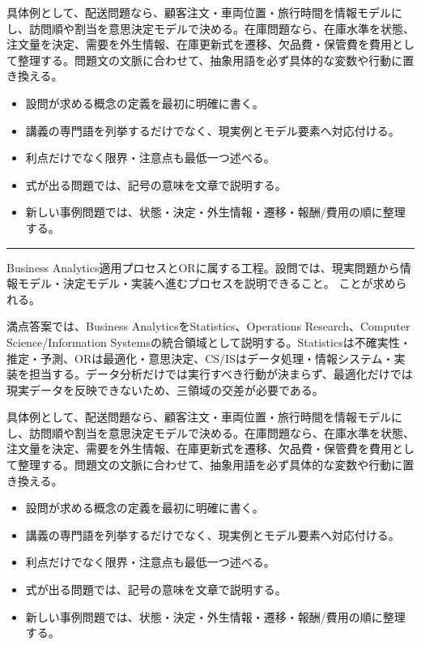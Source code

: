 具体例として、配送問題なら、顧客注文・車両位置・旅行時間を情報モデルにし、訪問順や割当を意思決定モデルで決める。在庫問題なら、在庫水準を状態、注文量を決定、需要を外生情報、在庫更新式を遷移、欠品費・保管費を費用として整理する。問題文の文脈に合わせて、抽象用語を必ず具体的な変数や行動に置き換える。\par
{}
\begin{itemize}
\item 設問が求める概念の定義を最初に明確に書く。
\item 講義の専門語を列挙するだけでなく、現実例とモデル要素へ対応付ける。
\item 利点だけでなく限界・注意点も最低一つ述べる。
\item 式が出る問題では、記号の意味を文章で説明する。
\item 新しい事例問題では、状態・決定・外生情報・遷移・報酬/費用の順に整理する。
\end{itemize}
\vspace{2mm}\hrule\vspace{2mm}
Business Analytics適用プロセスとORに属する工程。設問では、現実問題から情報モデル・決定モデル・実装へ進むプロセスを説明できること。 ことが求められる。\par
{}
満点答案では、Business AnalyticsをStatistics、Operations Research、Computer Science/Information Systemsの統合領域として説明する。Statisticsは不確実性・推定・予測、ORは最適化・意思決定、CS/ISはデータ処理・情報システム・実装を担当する。データ分析だけでは実行すべき行動が決まらず、最適化だけでは現実データを反映できないため、三領域の交差が必要である。\par
{}
具体例として、配送問題なら、顧客注文・車両位置・旅行時間を情報モデルにし、訪問順や割当を意思決定モデルで決める。在庫問題なら、在庫水準を状態、注文量を決定、需要を外生情報、在庫更新式を遷移、欠品費・保管費を費用として整理する。問題文の文脈に合わせて、抽象用語を必ず具体的な変数や行動に置き換える。\par
{}
\begin{itemize}
\item 設問が求める概念の定義を最初に明確に書く。
\item 講義の専門語を列挙するだけでなく、現実例とモデル要素へ対応付ける。
\item 利点だけでなく限界・注意点も最低一つ述べる。
\item 式が出る問題では、記号の意味を文章で説明する。
\item 新しい事例問題では、状態・決定・外生情報・遷移・報酬/費用の順に整理する。
\end{itemize}
